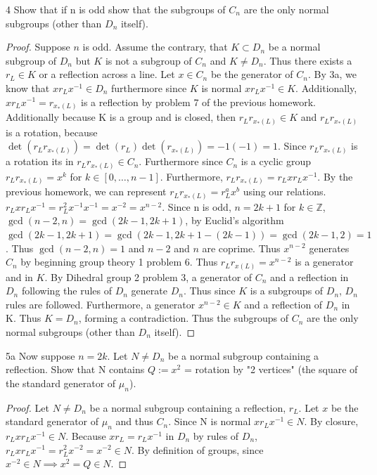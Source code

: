 \documentclass{article}
\newcommand{\Z}{\mathbb{Z}}
\begin{document}
\bigskip

\begin{claim}{4}
    Show that if n is odd show that the subgroups of $C_n$ are the only normal subgroups (other than $D_n$ itself).
\end{claim}
\begin{proof}
    Suppose $n$ is odd. Assume the contrary, that $K \subset D_n$ be a normal subgroup of $D_n$ but $K$ is not a subgroup of $C_n$ and $K \neq D_n$. Thus there exists a $r_L \in K$ or a reflection across a line. Let $x \in C_n$ be the generator of $C_n$. By 3a, we know that $xr_Lx^{-1} \in D_n$ furthermore since $K$ is normal $xr_Lx^{-1} \in K$. Additionally, $xr_Lx^{-1} = r_{x_*(L)}$ is a reflection by problem 7 of the previous homework. Additionally because K is a group and is closed, then $r_Lr_{x_*(L)} \in K$ and $r_Lr_{x_*(L)}$ is a rotation, because $\det(r_Lr_{x_*(L)}) = \det(r_L)\det(r_{x_*(L)}) = -1(-1) = 1$. Since $r_Lr_{x_*(L)}$ is a rotation its in $r_Lr_{x_*(L)} \in C_n$. Furthermore since $C_n$ is a cyclic group $r_Lr_{x_*(L)} = x^k$ for $k \in [0, \ldots, n-1]$. Furthermore, $r_Lr_{x_*(L)} = r_L x r_L x^{-1}$. By the previous homework, we can represent $r_Lr_{x_*(L)} = r_L^a x^b$ using our relations.  $r_L x r_L x^{-1} = r_L^2 x^{-1}x^{-1} = x^{-2} = x^{n - 2}$. Since n is odd, $n = 2k +1$ for $k \in \Z$, $\gcd(n-2, n) = \gcd(2k - 1, 2k + 1)$, by Euclid's algorithm $\gcd(2k - 1, 2k + 1) = \gcd(2k - 1, 2k + 1 - (2k - 1)) = \gcd(2k - 1, 2) = 1$. Thus $\gcd(n-2, n) = 1$ and $n - 2$ and $n$ are coprime. Thus $x^{n-2}$ generates $C_n$ by beginning group theory 1 problem 6. Thus $r_Lr_{x(L)} = x^{n-2}$ is a generator and in $K$. By Dihedral group 2 problem 3, a generator of $C_n$ and a reflection in $D_n$ following the rules of $D_n$ generate $D_n$. Thus since $K$ is a subgroups of $D_n$, $D_n$ rules are followed. Furthermore, a generator $x^{n-2} \in K$ and a reflection of $D_n$ in K. Thus $K = D_n$, forming a contradiction. Thus the subgroups of $C_n$ are the only normal subgroups (other than $D_n$ itself).
\end{proof}

\bigskip

\begin{claim}{5a}
    Now suppose $n =2k$. Let  $N \neq D_n$ be a normal subgroup containing a reflection. Show that N contains $Q:= x^2$ = rotation by "2 vertices" (the square of the standard generator of $\mu_n$). 
\end{claim}
\begin{proof}
    Let $N \neq D_n$ be a normal subgroup containing a reflection, $r_L$. Let $x$ be the standard generator of $\mu_n$ and thus $C_n$. Since N is normal $xr_Lx^{-1} \in N$. By closure, $r_Lxr_Lx^{-1} \in N$. Because $xr_L = r_Lx^{-1}$ in $D_n$ by rules of $D_n$, $r_Lxr_Lx^{-1} = r_L^2x^{-2} = x^{-2} \in N$. By definition of groups, since $x^{-2} \in N \implies x^2 = Q \in N$.
\end{proof}
\end{document}
